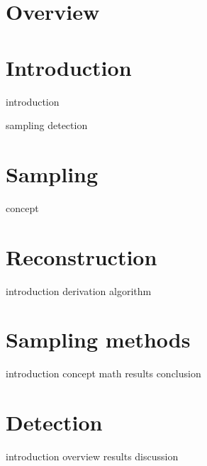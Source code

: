 \documentclass[a4paper, openany, oneside]{memoir}
\begin{document}
\chapter{Overview}

\chapter{Introduction}
{introduction}

{sampling}
{detection}


\chapter{Sampling}
\label{cha:sampling}

{concept}

\chapter{Reconstruction}
\label{cha:reconstruction}

{introduction}
{derivation}
{algorithm}

\chapter{Sampling methods}

{introduction}
{concept}
{math} 
{results}
{conclusion}


\chapter{Detection}

{introduction}
{overview}
{results}
{discussion}
\end{document}
